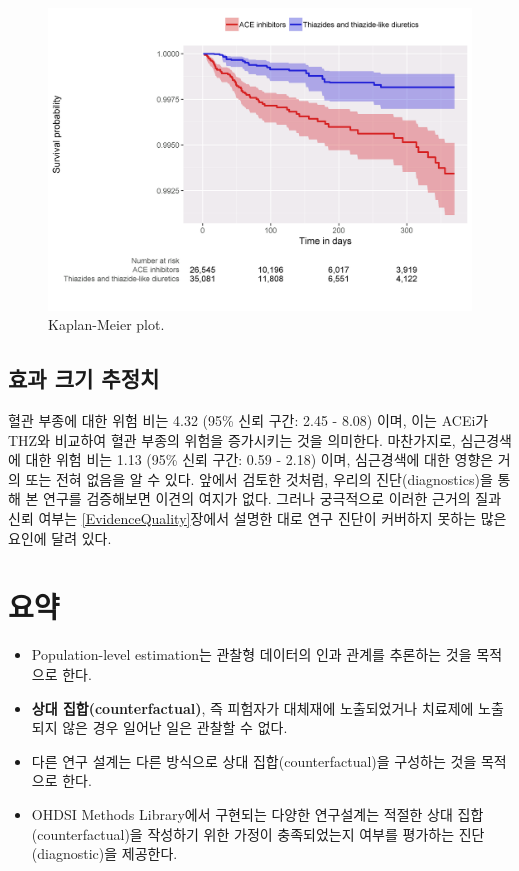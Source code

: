\documentclass[11pt]{book}
\theoremstyle{definition}
\theoremstyle{definition}
\theoremstyle{definition}
\theoremstyle{remark}
\let\BeginKnitrBlock\begin \let\EndKnitrBlock\end
\begin{document}
\begin{figure}

{\centering \includegraphics[width=1\linewidth]{images/PopulationLevelEstimation/kmPlot} 

}

\caption{Kaplan-Meier plot.}\label{fig:kmPlot}
\end{figure}

\subsection{효과 크기 추정치}\label{--}

혈관 부종에 대한 위험 비는 4.32 (95\% 신뢰 구간: 2.45 - 8.08) 이며, 이는
ACEi가 THZ와 비교하여 혈관 부종의 위험을 증가시키는 것을 의미한다.
마찬가지로, 심근경색에 대한 위험 비는 1.13 (95\% 신뢰 구간: 0.59 - 2.18)
이며, 심근경색에 대한 영향은 거의 또는 전혀 없음을 알 수 있다. 앞에서
검토한 것처럼, 우리의 진단(diagnostics)을 통해 본 연구를 검증해보면
이견의 여지가 없다. 그러나 궁극적으로 이러한 근거의 질과 신뢰 여부는
\ref{EvidenceQuality}장에서 설명한 대로 연구 진단이 커버하지 못하는 많은
요인에 달려 있다.

\section{요약}\label{-10}

\BeginKnitrBlock{rmdsummary}
\begin{itemize}
\item
  Population-level estimation는 관찰형 데이터의 인과 관계를 추론하는
  것을 목적으로 한다.
\item
  \textbf{상대 집합(counterfactual)}, 즉 피험자가 대체재에 노출되었거나
  치료제에 노출되지 않은 경우 일어난 일은 관찰할 수 없다.
\item
  다른 연구 설계는 다른 방식으로 상대 집합(counterfactual)을 구성하는
  것을 목적으로 한다.
\item
  OHDSI Methods Library에서 구현되는 다양한 연구설계는 적절한 상대
  집합(counterfactual)을 작성하기 위한 가정이 충족되었는지 여부를
  평가하는 진단 (diagnostic)을 제공한다.
\end{itemize}
\EndKnitrBlock{rmdsummary}
\end{document}
